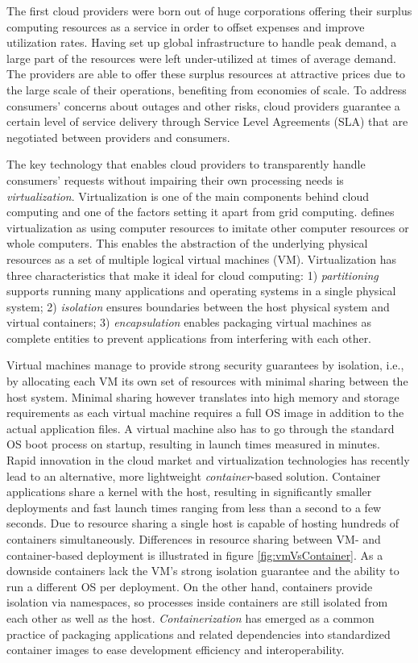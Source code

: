 The first cloud providers were born out of huge corporations offering their surplus computing resources as a service in order to offset expenses and improve utilization rates. Having set up global infrastructure to handle peak demand, a large part of the resources were left under-utilized at times of average demand. The providers are able to offer these surplus resources at attractive prices due to the large scale of their operations, benefiting from economies of scale. To address consumers' concerns about outages and other risks, cloud providers guarantee a certain level of service delivery through Service Level Agreements (SLA) that are negotiated between providers and consumers. \parencite{youseff08cloudOntology}

The key technology that enables cloud providers to transparently handle consumers' requests without impairing their own processing needs is \textit{virtualization}. Virtualization is one of the main components behind cloud computing and one of the factors setting it apart from grid computing. \textcite{sareen13cloudTypes} defines virtualization as using computer resources to imitate other computer resources or whole computers. This enables the abstraction of the underlying physical resources as a set of multiple logical virtual machines (VM). Virtualization has three characteristics that make it ideal for cloud computing: 1) \textit{partitioning} supports running many applications and operating systems in a single physical system; 2) \textit{isolation} ensures boundaries between the host physical system and virtual containers; 3) \textit{encapsulation} enables packaging virtual machines as complete entities to prevent applications from interfering with each other.

Virtual machines manage to provide strong security guarantees by isolation, i.e., by allocating each VM its own set of resources with minimal sharing between the host system. Minimal sharing however translates into high memory and storage requirements as each virtual machine requires a full OS image in addition to the actual application files. A virtual machine also has to go through the standard OS boot process on startup, resulting in launch times measured in minutes. Rapid innovation in the cloud market and virtualization technologies has recently lead to an alternative, more lightweight \textit{container}-based solution. Container applications share a kernel with the host, resulting in significantly smaller deployments and fast launch times ranging from less than a second to a few seconds. Due to resource sharing a single host is capable of hosting hundreds of containers simultaneously. Differences in resource sharing between VM- and container-based deployment is illustrated in figure \ref{fig:vmVsContainer}. As a downside containers lack the VM's strong isolation guarantee and the ability to run a different OS per deployment. On the other hand, containers provide isolation via namespaces, so processes inside containers are still isolated from each other as well as the host. \textit{Containerization} has emerged as a common practice of packaging applications and related dependencies into standardized container images to ease development efficiency and interoperability. \parencite{pahl15containerization}

